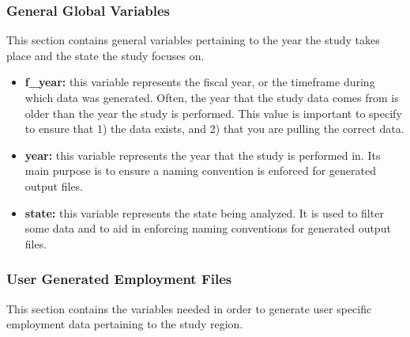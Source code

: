 \documentclass[
]{book}
\providecommand{\tightlist}{%
  \setlength{\itemsep}{0pt}\setlength{\parskip}{0pt}}
\begin{document}
\hypertarget{global}{%
\subsubsection{General Global Variables}\label{global}}

This section contains general variables pertaining to the year the study takes place and the state the study focuses on.

\begin{itemize}
\tightlist
\item
  \textbf{f\_year:} this variable represents the fiscal year, or the timeframe during which data was generated. Often, the year that the study data comes from is older than the year the study is performed. This value is important to specify to ensure that 1) the data exists, and 2) that you are pulling the correct data.\\
\item
  \textbf{year:} this variable represents the year that the study is performed in. Its main purpose is to ensure a naming convention is enforced for generated output files.
\item
  \textbf{state:} this variable represents the state being analyzed. It is used to filter some data and to aid in enforcing naming conventions for generated output files.
\end{itemize}

\hypertarget{generated-employ}{%
\subsubsection{User Generated Employment Files}\label{generated-employ}}

This section contains the variables needed in order to generate user specific employment data pertaining to the study region.
\end{document}
